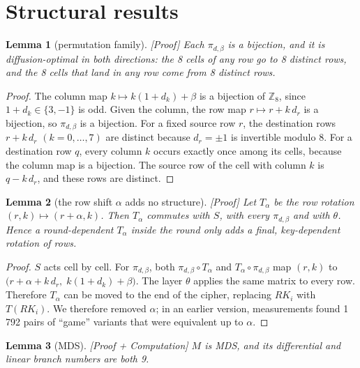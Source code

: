 \documentclass[11pt,a4paper]{article}
\newtheorem{lemma}{Lemma}
\newcommand{\ev}[1]{\textup{\textsf{[#1]}}}
\newcommand{\RK}{\mathit{RK}}
\newcommand{\Z}{\mathbb{Z}}
\begin{document}
\section{Structural results}\label{sec:struct}

\begin{lemma}[permutation family]\label{lem:perm}
\ev{Proof} Each $\pi_{d,\beta}$ is a bijection, and it is diffusion-optimal in both directions: the 8 cells of
any row go to 8 distinct rows, and the 8 cells that land in any row come from 8 distinct rows.
\end{lemma}

\begin{proof}
The column map $k \mapsto k(1 + d_k) + \beta$ is a bijection of $\Z_8$, since $1 + d_k \in \{3, -1\}$ is odd.
Given the column, the row map $r \mapsto r + k\,d_r$ is a bijection, so $\pi_{d,\beta}$ is a bijection. For a
fixed source row $r$, the destination rows $r + k\,d_r$ $(k = 0,\dots,7)$ are distinct because $d_r = \pm 1$ is
invertible modulo 8. For a destination row $q$, every column $k$ occurs exactly once among its cells, because the
column map is a bijection. The source row of the cell with column $k$ is $q - k\,d_r$, and these rows are
distinct.
\end{proof}

\begin{lemma}[the row shift $\alpha$ adds no structure]\label{lem:alpha}
\ev{Proof} Let $T_\alpha$ be the row rotation $(r,k) \mapsto (r+\alpha, k)$. Then $T_\alpha$ commutes with $S$,
with every $\pi_{d,\beta}$ and with $\theta$. Hence a round-dependent $T_\alpha$ inside the round only adds a
final, key-dependent rotation of rows.
\end{lemma}

\begin{proof}
$S$ acts cell by cell. For $\pi_{d,\beta}$, both $\pi_{d,\beta}\circ T_\alpha$ and $T_\alpha \circ \pi_{d,\beta}$
map $(r,k)$ to $\bigl(r + \alpha + k\,d_r,\; k(1+d_k) + \beta\bigr)$. The layer $\theta$ applies the same matrix
to every row. Therefore $T_\alpha$ can be moved to the end of the cipher, replacing $\RK_i$ with
$T(\RK_i)$. We therefore removed $\alpha$; in an earlier version, measurements found 1\,792 pairs of ``game''
variants that were equivalent up to $\alpha$.
\end{proof}

\begin{lemma}[MDS]\label{lem:mds}
\ev{Proof + Computation} $M$ is MDS, and its differential and linear branch numbers are both 9.
\end{lemma}
\end{document}
